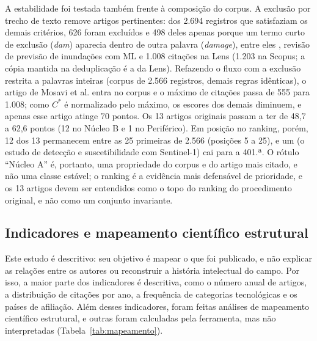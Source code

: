 A estabilidade foi testada também frente à composição do corpus. A exclusão por trecho de texto remove artigos pertinentes: dos 2.694 registros que satisfaziam os demais critérios, 626 foram excluídos e 498 deles apenas porque um termo curto de exclusão (\textit{dam}) aparecia dentro de outra palavra (\textit{damage}), entre eles , revisão de previsão de inundações com ML e 1.008 citações na Lens (1.203 na Scopus; a cópia mantida na deduplicação é a da Lens). Refazendo o fluxo com a exclusão restrita a palavras inteiras (corpus de 2.566 registros, demais regras idênticas), o artigo de Mosavi et al. entra no corpus e o máximo de citações passa de 555 para 1.008; como $C^{*}$ é normalizado pelo máximo, os escores dos demais diminuem, e apenas esse artigo atinge 70 pontos. Os 13 artigos originais passam a ter de 48,7 a 62,6 pontos (12 no Núcleo B e 1 no Periférico). Em posição no ranking, porém, 12 dos 13 permanecem entre as 25 primeiras de 2.566 (posições 5 a 25), e um (o estudo de detecção e suscetibilidade com Sentinel-1) cai para a 401.ª. O rótulo ``Núcleo A'' é, portanto, uma propriedade do corpus e do artigo mais citado, e não uma classe estável; o ranking é a evidência mais defensável de prioridade, e os 13 artigos devem ser entendidos como o topo do ranking do procedimento original, e não como um conjunto invariante.

\subsection{Indicadores e mapeamento científico estrutural}

Este estudo é descritivo: seu objetivo é mapear o que foi publicado, e não explicar as relações entre os autores ou reconstruir a história intelectual do campo. Por isso, a maior parte dos indicadores é descritiva, como o número anual de artigos, a distribuição de citações por ano, a frequência de categorias tecnológicas e os países de afiliação. Além desses indicadores, foram feitas análises de mapeamento científico estrutural, e outras foram calculadas pela ferramenta, mas não interpretadas (Tabela~\ref{tab:mapeamento}).

